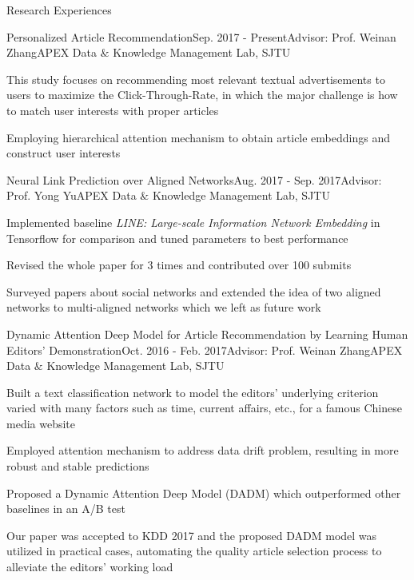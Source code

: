 \documentclass{resume} %
\begin{document}
\begin{rSection}{Research Experiences}
\begin{rSubsection}{Personalized Article Recommendation}{Sep. 2017 - Present}{Advisor: Prof. Weinan Zhang}{APEX Data $\&$ Knowledge Management Lab, SJTU}
\item This study focuses on recommending most relevant textual advertisements to users to maximize the Click-Through-Rate, in which the major challenge is how to match user interests with proper articles
\item Employing hierarchical attention mechanism to obtain article embeddings and construct user interests
\end{rSubsection}
\begin{rSubsection}{Neural Link Prediction over Aligned Networks}{Aug. 2017 - Sep. 2017}{Advisor: Prof. Yong Yu}{APEX Data $\&$ Knowledge Management Lab, SJTU}
\item Implemented baseline \emph{LINE: Large-scale Information Network Embedding} in Tensorflow for comparison and tuned parameters to best performance
\item Revised the whole paper for 3 times and contributed over 100 submits 
\item Surveyed papers about social networks and extended the idea of two aligned networks to multi-aligned networks which we left as future work
\end{rSubsection}
\vspace{110pt}
\begin{rSubsection}{Dynamic Attention Deep Model for Article Recommendation
by Learning Human Editors’ Demonstration}{Oct. 2016 - Feb. 2017}{Advisor: Prof. Weinan Zhang}{APEX Data $\&$ Knowledge Management Lab, SJTU}
\item Built a text classification network to model the editors' underlying criterion varied with many factors such as time, current affairs, etc., for a famous Chinese media website
\item Employed attention mechanism to address data drift problem, resulting in more robust and stable predictions
\item Proposed a Dynamic Attention Deep Model (DADM) which outperformed other baselines in an A/B test
\item Our paper was accepted to KDD 2017 and the proposed DADM model was utilized in practical cases, automating the quality article selection process to alleviate the editors' working load\\\\
\end{rSubsection}
\end{rSection}
\end{document}
